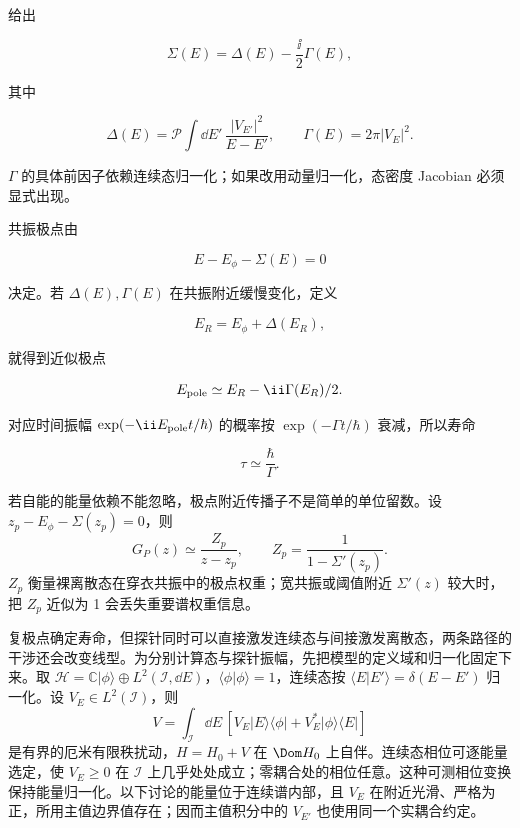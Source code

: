 给出

\begin{equation}
\Sigma(E)
=\Delta(E)-\frac{\ii}{2}\Gamma(E),
\label{eq:self-energy-split}
\end{equation}

其中

\begin{equation}
\Delta(E)
=\mathcal P\int\dd E'\,
\frac{|V_{E'}|^2}{E-E'},
\qquad
\Gamma(E)=2\pi|V_E|^2.
\label{eq:shift-width}
\end{equation}

\(\Gamma\) 的具体前因子依赖连续态归一化；如果改用动量归一化，态密度 Jacobian 必须显式出现。

共振极点由

\[
E-E_\phi-\Sigma(E)=0
\]

决定。若 \(\Delta(E),\Gamma(E)\) 在共振附近缓慢变化，定义

\[
E_R=E_\phi+\Delta(E_R),
\]

就得到近似极点

\[
E_{\rm pole}\simeq E_R-\ii\Gamma(E_R)/2.
\]

对应时间振幅 \(\exp(-\ii E_{\rm pole}t/\hbar)\) 的概率按 \(\exp(-\Gamma t/\hbar)\) 衰减，所以寿命

\[
\tau\simeq\frac{\hbar}{\Gamma}.
\]

若自能的能量依赖不能忽略，极点附近传播子不是简单的单位留数。设 $z_p-E_\phi-\Sigma(z_p)=0$，则
\begin{equation}
G_P(z)\simeq\frac{Z_p}{z-z_p},
\qquad
Z_p=\frac{1}{1-\Sigma'(z_p)}.
\label{eq:resonance-pole-residue}
\end{equation}
$Z_p$ 衡量裸离散态在穿衣共振中的极点权重；宽共振或阈值附近 $\Sigma'(z)$ 较大时，把 $Z_p$ 近似为 1 会丢失重要谱权重信息。

复极点确定寿命，但探针同时可以直接激发连续态与间接激发离散态，两条路径的干涉还会改变线型。为分别计算态与探针振幅，先把模型的定义域和归一化固定下来。取
$\mathcal H=\mathbb C|\phi\rangle\oplus L^2(\mathcal I,\dd E)$，$\langle\phi|\phi\rangle=1$，连续态按 $\langle E|E'\rangle=\delta(E-E')$ 归一化。设 $V_E\in L^2(\mathcal I)$，则
\[
 V=\int_{\mathcal I}\dd E\,[V_E|E\rangle\langle\phi|+V_E^*|\phi\rangle\langle E|]
\]
是有界的厄米有限秩扰动，$H=H_0+V$ 在 $\Dom H_0$ 上自伴。连续态相位可逐能量选定，使 $V_E\ge0$ 在 $\mathcal I$ 上几乎处处成立；零耦合处的相位任意。这种可测相位变换保持能量归一化。以下讨论的能量位于连续谱内部，且 $V_E$ 在附近光滑、严格为正，所用主值边界值存在；因而主值积分中的 $V_{E'}$ 也使用同一个实耦合约定。

